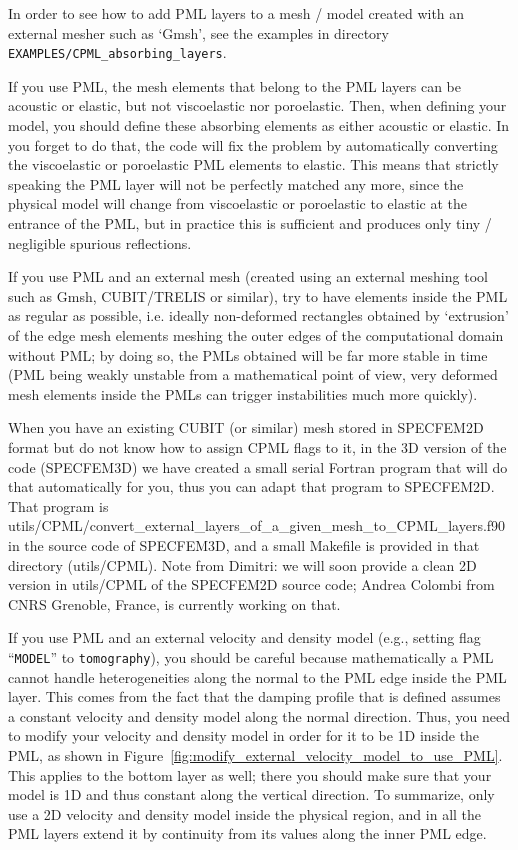 \documentclass[oneside,english,onecolumn,letterpaper]{book}
\begin{document}
In order to see how to add PML layers to a mesh / model created with an external mesher such as `Gmsh', see the examples in directory
\texttt{EXAMPLES/CPML\_absorbing\_layers}.

If you use PML, the mesh elements that belong to the PML layers can be acoustic or elastic, but not viscoelastic nor poroelastic.
Then, when defining your model, you should define these absorbing elements as either acoustic or elastic.
In you forget to do that, the code will fix the problem by automatically converting the viscoelastic or poroelastic PML
elements to elastic. This means that strictly speaking the PML layer will not be perfectly matched any more, since the physical
model will change from viscoelastic or poroelastic to elastic at the entrance of the PML, but in practice this is sufficient and
produces only tiny / negligible spurious reflections.

If you use PML and an external mesh (created using an external meshing tool
such as Gmsh, CUBIT/TRELIS or similar), try to have elements inside the PML as regular as possible,
i.e. ideally non-deformed rectangles obtained by `extrusion' of the edge mesh elements meshing the
outer edges of the computational domain without PML; by doing so, the PMLs obtained will be far more stable
in time (PML being weakly unstable from a mathematical point of view, very deformed mesh elements
inside the PMLs can trigger instabilities much more quickly).

When you have an existing CUBIT (or similar) mesh stored in SPECFEM2D
format but do not know how to assign CPML flags to it, in the 3D version of the code (SPECFEM3D)
we have created a small serial Fortran program that will do that automatically for you, thus you can adapt that program to SPECFEM2D.
That program is utils/CPML/convert\_external\_layers\_of\_a\_given\_mesh\_to\_CPML\_layers.f90 in the source code of SPECFEM3D,
and a small Makefile is provided in that directory (utils/CPML).
Note from Dimitri: we will soon provide a clean 2D version in utils/CPML of the SPECFEM2D source code;
Andrea Colombi from CNRS Grenoble, France, is currently working on that.

If you use PML and an external velocity and density model (e.g., setting flag ``\texttt{MODEL}'' to \texttt{tomography}),
you should be careful because mathematically a PML cannot handle heterogeneities along the
normal to the PML edge inside the PML layer. This comes from the fact that the damping profile
that is defined assumes a constant velocity and density model along the normal
direction.
Thus, you need to modify your velocity and density model in order for it to be 1D inside
the PML, as shown in Figure~\ref{fig:modify_external_velocity_model_to_use_PML}.
This applies to the bottom layer as well; there you should make sure
that your model is 1D and thus constant along the vertical direction.
To summarize, only use a 2D velocity and density model inside the physical region, and in
all the PML layers extend it by continuity from its values along the
inner PML edge.
\end{document}
